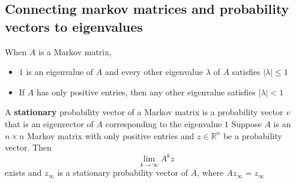 \begin{enumerate}
\subsection{Connecting markov matrices and probability vectors to 
eigenvalues}
When $A$ is a Markov matrix,
\begin{itemize}
  \item $1$ is an eigenvalue of $A$ and every other eigenvalue 
    $\lambda$ of $A$ satisfies $|\lambda| \leq 1$ 
  \item If $A$ has only positive entries, then any other eigenvalue 
    satisfies $|\lambda| < 1$ 
\end{itemize}
A \textbf{stationary} probability vector of a Markov matrix is a 
probability vector $v$ that is an eigenvector of $A$ corresponding 
to the eigenvalue $1$ 
Suppose $A$ is an $n \times n$ Markov matrix with only positive entries and $z \in \mathbb{R}^n$ be a probability vector. Then 
\[
  \lim_{k \rightarrow \infty} A^k z 
\]
exists and $z_\infty$ is a stationary probability vector of $A$, 
where $Az_\infty = z_\infty$ 

\end{enumerate}
